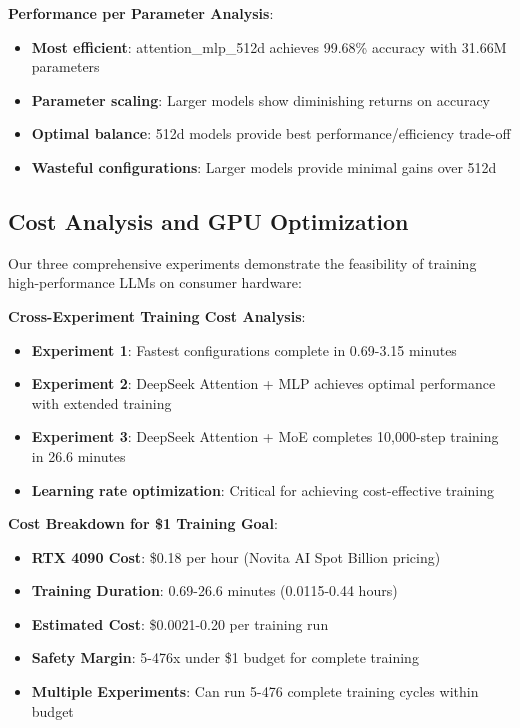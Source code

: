 \documentclass[11pt,a4paper]{article}
\begin{document}
\textbf{Performance per Parameter Analysis}:
\begin{itemize}
    \item \textbf{Most efficient}: attention\_mlp\_512d achieves 99.68\% accuracy with 31.66M parameters
    \item \textbf{Parameter scaling}: Larger models show diminishing returns on accuracy
    \item \textbf{Optimal balance}: 512d models provide best performance/efficiency trade-off
    \item \textbf{Wasteful configurations}: Larger models provide minimal gains over 512d
\end{itemize}

\subsection{Cost Analysis and GPU Optimization}

Our three comprehensive experiments demonstrate the feasibility of training high-performance LLMs on consumer hardware:

\textbf{Cross-Experiment Training Cost Analysis}:
\begin{itemize}
    \item \textbf{Experiment 1}: Fastest configurations complete in 0.69-3.15 minutes
    \item \textbf{Experiment 2}: DeepSeek Attention + MLP achieves optimal performance with extended training
    \item \textbf{Experiment 3}: DeepSeek Attention + MoE completes 10,000-step training in 26.6 minutes
    \item \textbf{Learning rate optimization}: Critical for achieving cost-effective training
\end{itemize}

\textbf{Cost Breakdown for \$1 Training Goal}:
\begin{itemize}
    \item \textbf{RTX 4090 Cost}: \$0.18 per hour (Novita AI Spot Billion pricing)
    \item \textbf{Training Duration}: 0.69-26.6 minutes (0.0115-0.44 hours)
    \item \textbf{Estimated Cost}: \$0.0021-0.20 per training run
    \item \textbf{Safety Margin}: 5-476x under \$1 budget for complete training
    \item \textbf{Multiple Experiments}: Can run 5-476 complete training cycles within budget
\end{itemize}
\end{document}
